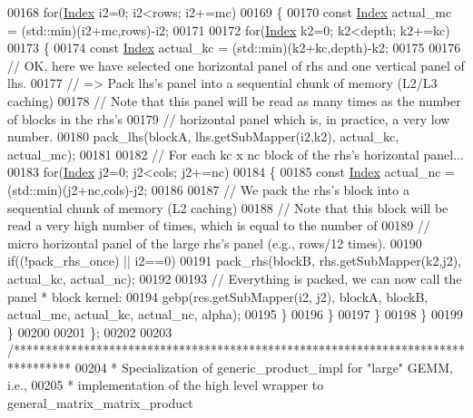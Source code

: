 \begin{DoxyCode}
00168     \textcolor{keywordflow}{for}(\hyperlink{namespace_eigen_a62e77e0933482dafde8fe197d9a2cfde}{Index} i2=0; i2<rows; i2+=mc)
00169     \{
00170       \textcolor{keyword}{const} \hyperlink{namespace_eigen_a62e77e0933482dafde8fe197d9a2cfde}{Index} actual\_mc = (std::min)(i2+mc,rows)-i2;
00171 
00172       \textcolor{keywordflow}{for}(\hyperlink{namespace_eigen_a62e77e0933482dafde8fe197d9a2cfde}{Index} k2=0; k2<depth; k2+=kc)
00173       \{
00174         \textcolor{keyword}{const} \hyperlink{namespace_eigen_a62e77e0933482dafde8fe197d9a2cfde}{Index} actual\_kc = (std::min)(k2+kc,depth)-k2;
00175 
00176         \textcolor{comment}{// OK, here we have selected one horizontal panel of rhs and one vertical panel of lhs.}
00177         \textcolor{comment}{// => Pack lhs's panel into a sequential chunk of memory (L2/L3 caching)}
00178         \textcolor{comment}{// Note that this panel will be read as many times as the number of blocks in the rhs's}
00179         \textcolor{comment}{// horizontal panel which is, in practice, a very low number.}
00180         pack\_lhs(blockA, lhs.getSubMapper(i2,k2), actual\_kc, actual\_mc);
00181 
00182         \textcolor{comment}{// For each kc x nc block of the rhs's horizontal panel...}
00183         \textcolor{keywordflow}{for}(\hyperlink{namespace_eigen_a62e77e0933482dafde8fe197d9a2cfde}{Index} j2=0; j2<cols; j2+=nc)
00184         \{
00185           \textcolor{keyword}{const} \hyperlink{namespace_eigen_a62e77e0933482dafde8fe197d9a2cfde}{Index} actual\_nc = (std::min)(j2+nc,cols)-j2;
00186 
00187           \textcolor{comment}{// We pack the rhs's block into a sequential chunk of memory (L2 caching)}
00188           \textcolor{comment}{// Note that this block will be read a very high number of times, which is equal to the number of}
00189           \textcolor{comment}{// micro horizontal panel of the large rhs's panel (e.g., rows/12 times).}
00190           \textcolor{keywordflow}{if}((!pack\_rhs\_once) || i2==0)
00191             pack\_rhs(blockB, rhs.getSubMapper(k2,j2), actual\_kc, actual\_nc);
00192 
00193           \textcolor{comment}{// Everything is packed, we can now call the panel * block kernel:}
00194           gebp(res.getSubMapper(i2, j2), blockA, blockB, actual\_mc, actual\_kc, actual\_nc, alpha);
00195         \}
00196       \}
00197     \}
00198   \}
00199 \}
00200 
00201 \};
00202 
00203 \textcolor{comment}{/*********************************************************************************}
00204 \textcolor{comment}{*  Specialization of generic\_product\_impl for "large" GEMM, i.e.,}
00205 \textcolor{comment}{*  implementation of the high level wrapper to general\_matrix\_matrix\_product}

\end{DoxyCode}
